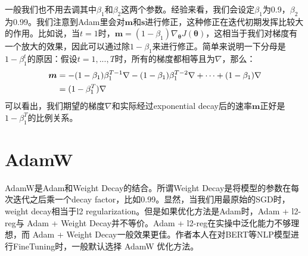 一般我们也不用去调其中$\beta_1$和$\beta_2$这两个参数。经验来看，我们会设定$\beta_1$为0.9，$\beta_2$为0.99。我们注意到Adam里会对$\bm{m}$和$\bm{s}$进行修正，这种修正在迭代初期发挥比较大的作用。比如说，当$t=1$时，$\bm{m}=(1 - \beta_1) \nabla_{\bm{\theta}}{J(\bm{\theta})}$，这相当于我们对梯度有一个放大的效果，因此可以通过除$1-\beta_1$来进行修正。简单来说明一下分母是$1-\beta_1^t$的原因：假设$t=1,...,T$时，所有的梯度都相等且为$\nabla$，那么：
\begin{align}
  \label{adam_beta}
  \bm{m} &= -(1-\beta_1)\beta_1^{T-1}\nabla - (1-\beta_1)\beta_1^{T-2} \nabla + \dots + (1-\beta_1)\nabla \\
         &= (1 - \beta_1^T) \nabla  \notag
\end{align}
可以看出，我们期望的梯度$\nabla$和实际经过exponential decay后的速率$\bm{m}$正好是$1-\beta_1^T$的比例关系。

\section{AdamW}

AdamW是Adam和Weight Decay的结合。所谓Weight Decay是将模型的参数在每次迭代之后乘一个decay factor，比如0.99。显然，当我们用最原始的SGD时，weight decay相当于l2 regularization。但是如果优化方法是Adam时，Adam + l2-reg与 Adam + Weight Decay并不等价。Adam + l2-reg在实操中泛化能力不够理想，而 Adam + Weight Decay一般效果更佳。作者本人在对BERT等NLP模型进行FineTuning时，一般默认选择 AdamW 优化方法。
